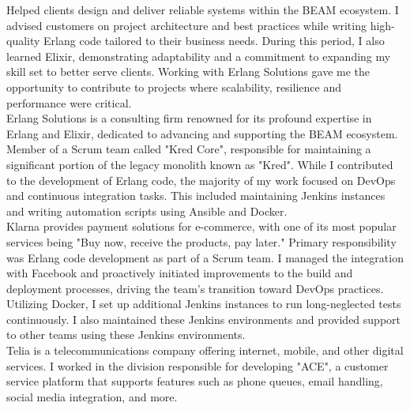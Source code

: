 \documentclass[purpleprocv]{procv}
\begin{document}
\begin{procv-twocolumns}
{          
          {Helped clients design and deliver reliable systems 
          within the BEAM ecosystem. I advised customers on project architecture and best practices 
          while writing high-quality Erlang code tailored to their business needs. During this period, 
          I also learned Elixir, demonstrating adaptability and a commitment to expanding my skill set 
          to better serve clients. Working with Erlang Solutions gave me the opportunity to contribute 
          to projects where scalability, resilience and performance were critical.
          \\[3pt]
          Erlang Solutions is a consulting firm renowned for its profound expertise in Erlang and Elixir, 
          dedicated to advancing and supporting the BEAM ecosystem.}
          {Member of a Scrum team called "Kred Core", responsible for maintaining a significant portion of 
          the legacy monolith known as "Kred". While I contributed to the development of Erlang code, the majority 
          of my work focused on DevOps and continuous integration tasks. This included maintaining Jenkins instances 
          and writing automation scripts using Ansible and Docker.
          \\[3pt]
          Klarna provides payment solutions for e-commerce, with one of its most popular services being 
          "Buy now, receive the products, pay later."}
          {Primary responsibility was Erlang code development as part of a Scrum team. I managed the integration 
          with Facebook and proactively initiated improvements 
          to the build and deployment processes, driving the team’s transition toward DevOps practices. Utilizing 
          Docker, I set up additional Jenkins instances to run long-neglected tests continuously. I also maintained 
          these Jenkins environments and provided support to other teams using these Jenkins environments.
          \\[3pt]
          Telia is a telecommunications company offering internet, mobile, and other digital services. I worked 
          in the division responsible for developing "ACE", a customer service platform that supports features 
          such as phone queues, email handling, social media integration, and more.}
}
\end{procv-twocolumns}
\end{document}
